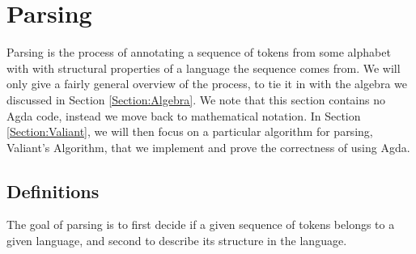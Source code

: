 \newcommand{\productions}{P}
\newcommand{\nonterminals}{N}
\newcommand{\terminals}{\Sigma}
\newcommand{\startsymbol}{S}
\newcommand{\grammar}{(\nonterminals, \terminals, \productions, \startsymbol)}
\section{Parsing}
Parsing is the process of annotating a sequence of tokens from some alphabet with with structural properties of a language the sequence comes from. We will only give a fairly general overview of the process, to tie it in with the algebra we discussed in Section \ref{Section:Algebra}. We note that this section contains no Agda code, instead we move back to mathematical notation. In Section \ref{Section:Valiant}, we will then focus on a particular algorithm for parsing, Valiant's Algorithm, that we implement and prove the correctness of using Agda.

\subsection{Definitions}
The goal of parsing is to first decide if a given sequence of tokens belongs to a given language, and second to describe its structure in the language.

